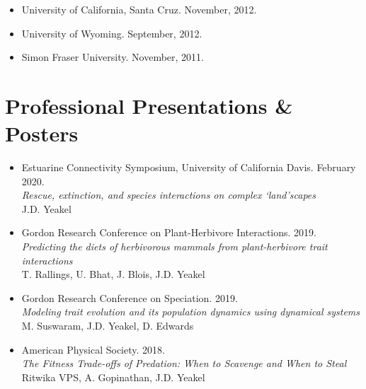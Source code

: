 \documentclass[margin,line,12pt]{res}
\begin{document}
\begin{resume}
\begin{itemize}
\item University of California, Santa Cruz. November, 2012.

\item University of Wyoming. September, 2012.

\item Simon Fraser University. November, 2011.
\end{itemize}

\section{\sc Professional Presentations \& Posters}
\begin{itemize}

\item Estuarine Connectivity Symposium, University of California Davis. February 2020.\\
\emph{Rescue, extinction, and species interactions on complex `land'scapes}\\
J.D. Yeakel

\item Gordon Research Conference on Plant-Herbivore Interactions. 2019.\\
\emph{Predicting the diets of herbivorous mammals from plant-herbivore trait interactions}\\
T. Rallings, U. Bhat, J. Blois, J.D. Yeakel

\item Gordon Research Conference on Speciation. 2019.\\
\emph{Modeling trait evolution and its population dynamics using dynamical systems}\\
M. Suswaram, J.D. Yeakel, D. Edwards

\item American Physical Society. 2018.\\
\emph{The Fitness Trade-offs of Predation: When to Scavenge and When to Steal}\\
Ritwika VPS, A. Gopinathan, J.D. Yeakel


\end{itemize}
\end{resume}
\end{document}
